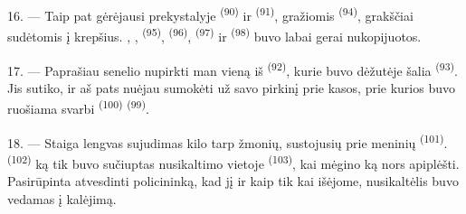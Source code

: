 16. --- Taip pat gėrėjausi prekystalyje  \textsuperscript{(90)} ir
 \textsuperscript{(91)}, gražiomis  \textsuperscript{(94)}, grakščiai sudėtomis į krepšius. ,
,  \textsuperscript{(95)}, 
\textsuperscript{(96)},  \textsuperscript{(97)} ir 
\textsuperscript{(98)} buvo labai gerai nukopijuotos.

\VUsaut{4.4mm}
\VUsaut{2.8mm}

17. --- Paprašiau senelio nupirkti man vieną iš 
\textsuperscript{(92)}, kurie buvo dėžutėje šalia 
\textsuperscript{(93)}. Jis sutiko, ir aš pats nuėjau sumokėti už savo pirkinį prie
kasos, prie kurios buvo ruošiama svarbi  \textsuperscript{(100)}
 \textsuperscript{(99)}.

18. --- Staiga lengvas sujudimas kilo tarp žmonių, sustojusių prie meninių
 \textsuperscript{(101)}. 
\textsuperscript{(102)} ką tik buvo sučiuptas nusikaltimo vietoje
 \textsuperscript{(103)}, kai mėgino ką nors apiplėšti.
Pasirūpinta atvesdinti policininką, kad jį  ir kaip tik kai išėjome,
nusikaltėlis buvo vedamas į kalėjimą.

\VUsaut{6.0mm}
\VUfilet{22mm}
